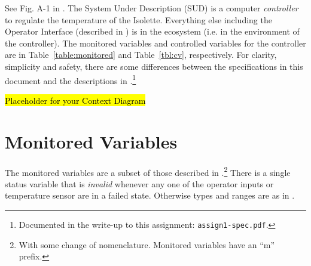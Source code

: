 \documentclass[fontsize=12pt,paper=letter,twoside]{scrartcl}
\begin{document}
See Fig. A-1 in \cite{REMH}. The System Under Description (SUD) is a computer \emph{controller} to regulate the temperature of the Isolette. Everything else including the Operator Interface (described in \cite{REMH}) is in the ecosystem (i.e. in the environment of the controller). The monitored variables and controlled variables for the controller are in Table~\ref{table:monitored} and 
Table~\ref{tbl:cv}, respectively. For clarity, simplicity and safety, there are some differences between the specifications in this document and the descriptions in \cite{REMH}.\footnote{%
Documented in the write-up to this assignment: \texttt{assign1-spec.pdf}.}

\hl{Placeholder for your Context Diagram}


\newpage
\section{Monitored Variables}
The monitored variables are a subset of those described in \cite{REMH}.\footnote{With some change of nomenclature. Monitored variables have an ``m'' prefix.} There is a single status variable  that is \emph{invalid} whenever any one of the operator inputs or temperature sensor are in a failed state. Otherwise types and ranges are as in \cite{REMH}.
\end{document}
